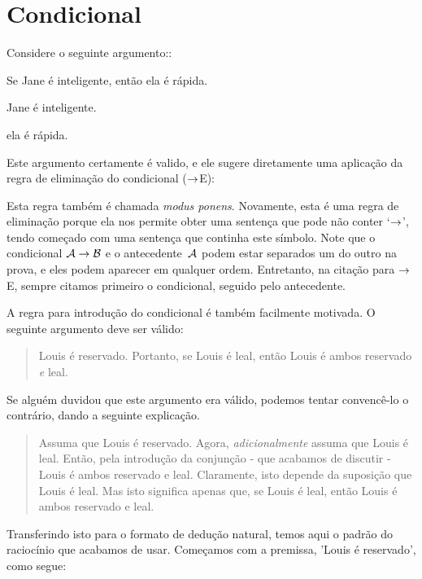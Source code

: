 \section{Condicional}
Considere o seguinte argumento::
\begin{earg}
		\item[] Se Jane \'e inteligente, ent\~ao ela \'e r\'apida.
		\item[] Jane \'e inteligente.
		\item[\therefore] ela \'e r\'apida.
\end{earg}
Este argumento certamente \'e valido, e ele sugere diretamente uma aplica\c c\~ao da  regra de elimina\c c\~ao do condicional  ($\rightarrow$E):
 
 Esta regra tamb\'em \'e chamada  \emph{modus ponens}. 
Novamente, esta \'e uma regra de elimina\c c\~ao porque ela nos permite obter uma senten\c ca que pode n\~ao conter `$\rightarrow$', tendo come\c cado com uma senten\c ca que continha este s\'imbolo. Note que o condicional  $\mathcal{A}\rightarrow\mathcal{B}$ e o antecedente~$\mathcal{A}$ podem estar separados um do outro na prova, e eles podem aparecer em qualquer ordem. Entretanto, na cita\c c\~ao para $\rightarrow$E, sempre citamos primeiro o condicional, seguido pelo antecedente. 

 A regra para introdu\c c\~ao do condicional \'e tamb\'em facilmente  motivada.  O seguinte argumento deve ser v\'alido:
	\begin{quote}
		Louis \'e reservado.    Portanto, se Louis \'e leal, ent\~ao Louis \'e ambos  reservado \emph{e} leal.
	\end{quote}
Se algu\'em duvidou que este argumento era v\'alido, podemos tentar convenc\^e-lo o contr\'ario, dando a seguinte explica\c c\~ao.
	\begin{quote}
		Assuma que  Louis \'e reservado.  Agora, \emph{adicionalmente} assuma que Louis \'e leal.  Ent\~ao, pela introdu\c c\~ao da conjun\c c\~ao  - que acabamos de discutir -  Louis \'e ambos  reservado e leal.  Claramente, isto depende da suposi\c c\~ao que Louis \'e leal.  Mas isto significa apenas que, se Louis \'e  leal,  ent\~ao Louis \'e ambos   reservado e leal. 
	\end{quote}
Transferindo isto para o formato de dedu\c c\~ao natural,  temos aqui o padr\~ao do racioc\'inio  que acabamos de usar.  Come\c camos com a premissa, 'Louis \'e reservado',  como segue: 

